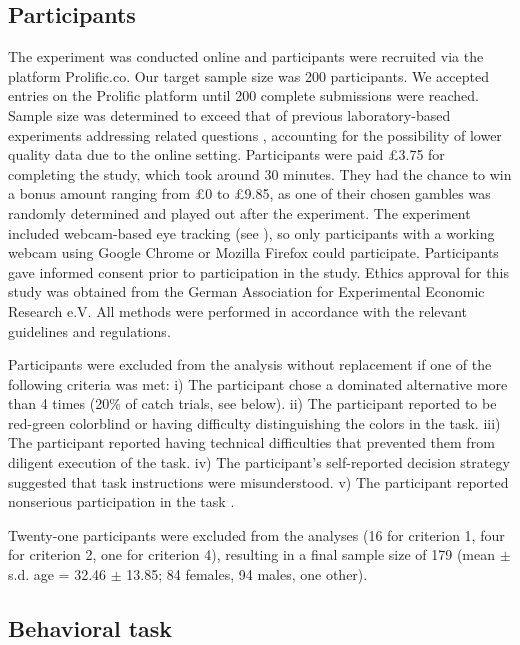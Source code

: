 \documentclass[11pt, a4paper, twocolumn, abstract]{scrartcl}
\begin{document}
\subsection*{Participants}
\label{methods:participants}
The experiment was conducted online and participants were recruited via the platform Prolific.co. Our target sample size was 200 participants. We accepted entries on the Prolific platform until 200 complete submissions were reached. Sample size was determined to exceed that of previous laboratory-based experiments addressing related questions \parencite[e.g.,][]{armel2008BiasingSimpleChoices,liu2020ExploitingDynamicsEye,parnamets2015BiasingMoralDecisions,sui2020TimingGazecontingentDecision,fisher2021IntertemporalChoicesAre}, accounting for the possibility of lower quality data due to the online setting. 
Participants were paid £3.75 for completing the study, which took around 30 minutes. They had the chance to win a bonus amount ranging from £0 to £9.85, as one of their chosen gambles was randomly determined and played out after the experiment. The experiment included webcam-based eye tracking (see ), so only participants with a working webcam using Google Chrome or Mozilla Firefox could participate.
Participants gave informed consent prior to participation in the study. Ethics approval for this study was obtained from the German Association for Experimental Economic Research e.V. All methods were performed in accordance with the relevant guidelines and regulations.

Participants were excluded from the analysis without replacement if one of the following criteria was met: i) The participant chose a dominated alternative more than 4 times (20\% of catch trials, see below). ii) The participant reported to be red-green colorblind or having difficulty distinguishing the colors in the task. iii) The participant reported having technical difficulties that prevented them from diligent execution of the task. iv) The participant's self-reported decision strategy suggested that task instructions were misunderstood. v) The participant reported nonserious participation in the task \parencite{aust2013SeriousnessChecksAre}.

Twenty-one participants were excluded from the analyses (16 for criterion 1, four for criterion 2, one for criterion 4), resulting in a final sample size of 179 (mean $\pm$ s.d. age = 32.46 $\pm$ 13.85; 84 females, 94 males, one other).

\subsection*{Behavioral task}
\label{sec:methods:task}
\end{document}
